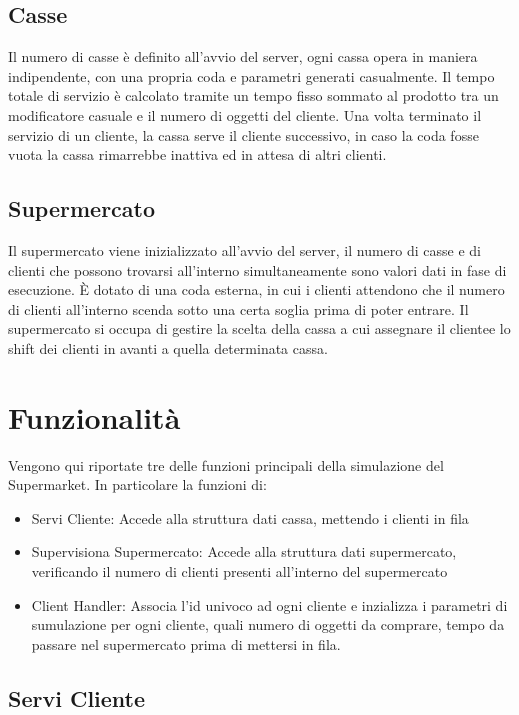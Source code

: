 \documentclass[a4paper, 12pt]{article}
\begin{document}
\subsection{Casse}
Il numero di casse è definito all'avvio del server, ogni cassa opera in 
maniera indipendente, con una propria coda e parametri generati casualmente.
Il tempo totale di servizio è calcolato tramite un tempo fisso sommato al prodotto tra
un modificatore casuale e il numero di oggetti del cliente.
Una volta terminato il servizio di un cliente, la cassa serve il cliente successivo,
in caso la coda fosse vuota la cassa rimarrebbe inattiva ed in attesa di altri clienti.

\newpage

\subsection{Supermercato}
Il supermercato viene inizializzato all'avvio del server, il numero di casse e di clienti
che possono trovarsi all'interno simultaneamente sono valori dati in fase di esecuzione.
È dotato di una coda esterna, in cui i clienti attendono che il numero di clienti all'interno
scenda sotto una certa soglia prima di poter entrare.
Il supermercato si occupa di gestire la scelta della cassa a cui assegnare il clientee  lo shift
dei clienti in avanti a quella determinata cassa.
\section{Funzionalità}
Vengono qui riportate tre delle funzioni principali della simulazione del Supermarket. In particolare la funzioni di:
\begin{itemize}[noitemsep,topsep=0pt,parsep=0pt,partopsep=0pt]
    \item Servi Cliente: Accede alla struttura dati cassa, mettendo i clienti in fila
    \item Supervisiona Supermercato: Accede alla struttura dati supermercato, verificando il numero di clienti presenti all'interno del supermercato
    \item Client Handler: Associa l'id univoco ad ogni cliente e inzializza i parametri di sumulazione per ogni cliente, quali numero di oggetti da comprare, tempo da passare nel supermercato prima di mettersi in fila.
\end{itemize}
\subsection{Servi Cliente}

\end{document}
